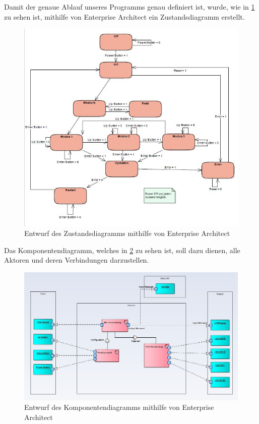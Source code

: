 \label{ArchitekturundVerhalten}


Damit der genaue Ablauf unseres Programms genau definiert ist, wurde, wie in \ref{fig:Statemachine} zu sehen ist, mithilfe von Enterprise Architect ein Zustandsdiagramm erstellt. \\

\begin{figure}[!hbt]
	\centering
	\includegraphics[width=0.9\linewidth]{Images/Statemachine}
	\caption{Entwurf des Zustandsdiagramms mithilfe von Enterprise Architect}
	\label{fig:Statemachine}
\end{figure}

Das Komponentendiagramm, welches in \ref{fig:KomponentenDiagramm} zu sehen ist, soll dazu dienen, alle Aktoren und deren Verbindungen darzustellen. \\

\begin{figure}[!hbt]
	\centering
	\includegraphics[width=0.9\linewidth]{Images/Komponentendiagramm}
	\caption{Entwurf des Komponentendiagramms mithilfe von Enterprise Architect}
	\label{fig:KomponentenDiagramm}
\end{figure}